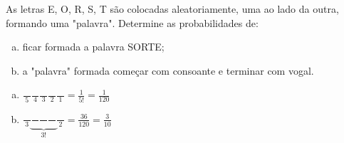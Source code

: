 \begin{ex}
 As letras E, O, R, S, T são colocadas aleatoriamente, uma ao lado da outra, formando uma "palavra". Determine as probabilidades de:
    \begin{enumerate}[(a)]
    \item ficar formada a palavra SORTE;
    \item a "palavra" formada começar com consoante e terminar com vogal.
    \end{enumerate}
\begin{sol}

    \phantom{A}
    \begin{enumerate}[(a)]

      \item  $ \frac{\phantom{10}}{5} \frac{\phantom{10}}{4} \frac{\phantom{10}}{3} \frac{\phantom{10}}{2} \frac{\phantom{10}}{1} 
      = \frac{1}{5! }= \frac{1}{120}$
      
      \item $ \frac{\phantom{10}}{3}
      \underbrace{
      \frac{\phantom{10}}{\phantom{10}} 
      \frac{\phantom{10}}{\phantom{10}} 
      \frac{\phantom{10}}{\phantom{10}}}_\text{3!}
      \frac{\phantom{10}}{2} = \frac{36}{120} = \frac{3}{10} $
    \end{enumerate}
\end{sol}
\end{ex}